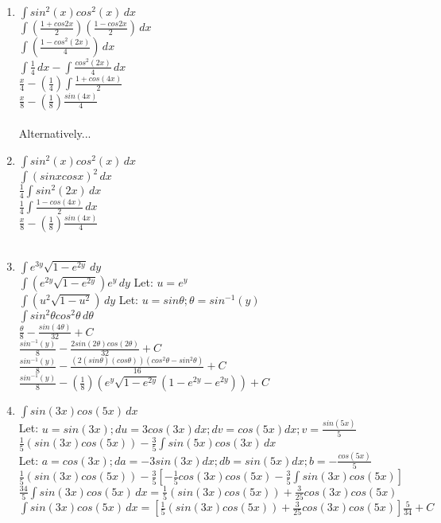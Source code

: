 \documentclass{article}
\begin{document}
\begin{enumerate}
\begin{enumerate}
        \item $\int sin^2(x)cos^2(x) \,dx$\\
        $\int {(\frac{1+cos2x}{2})(\frac{1-cos2x}{2})} \,dx$\\
        $\int {(\frac{1-cos^2(2x)}{4})} \,dx$\\
        $\int {\frac{1}{4}} \,dx - \int {\frac{cos^2(2x)}{4}} \,dx $\\
        $\frac{x}{4} - (\frac{1}{4})\int {\frac{1+cos(4x)}{2}}$\\
        $\frac{x}{8} - (\frac{1}{8})\frac{sin(4x)}{4}$\\\\
        Alternatively...\\
        \item $\int sin^2(x)cos^2(x) \,dx$\\
        $\int {(sinxcosx)^2} \,dx$\\
        $\frac{1}{4}\int {sin^2(2x)} \,dx$\\
        $\frac{1}{4}\int \frac{1-cos(4x)}{2} \,dx$\\
        $\frac{x}{8} - (\frac{1}{8})\frac{sin(4x)}{4}$\\\\

        \item $\int e^{3y}\sqrt{1-e^{2y}} \,dy$\\
        $\int (e^{2y}\sqrt{1-e^{2y}})e^{y} \,dy$  Let: $u=e^{y}$\\
        $\int (u^2\sqrt{1-u^2}) \,dy$ Let: $u=sin{\theta}; \theta=sin^{-1}(y)$\\
        $\int {sin^2\theta}{cos^2\theta} \,d\theta$\\
        $\frac{\theta}{8} - \frac{sin(4\theta)}{32} + C$\\
        $\frac{sin^{-1}(y)}{8} - \frac{2sin(2\theta)cos(2\theta)}{32} + C$\\
        $\frac{sin^{-1}(y)}{8} - \frac{(2(sin\theta)(cos\theta))(cos^2\theta-sin^2\theta)}{16} + C$\\
        $\frac{sin^{-1}(y)}{8} - (\frac{1}{8})(e^{y}\sqrt{1-e^{2y}}(1-e^{2y}-e^{2y})) + C$\\
        
        \item $\int {sin(3x)cos(5x)} \,dx$\\
        Let: $u=sin(3x);du=3cos(3x)dx;dv=cos(5x)dx;v=\frac{sin(5x)}{5}$\\
        $\frac{1}{5}(sin(3x)cos(5x)) - \frac{3}{5}\int {sin(5x)cos(3x)} \,dx$\\
        Let: $a=cos(3x);da=-3sin(3x)dx;db=sin(5x)dx;b=-\frac{cos(5x)}{5}$\\
        $\frac{1}{5}(sin(3x)cos(5x)) - \frac{3}{5} [-\frac{1}{5}cos(3x)cos(5x)- \frac{3}{5}\int {sin(3x)cos(5x)}]$\\
        $\frac{34}{5}\int {sin(3x)cos(5x)} \,dx = \frac{1}{5}(sin(3x)cos(5x)) + \frac{3}{25}cos(3x)cos(5x)$\\
        $\int {sin(3x)cos(5x)} \,dx = [\frac{1}{5}(sin(3x)cos(5x)) + \frac{3}{25}cos(3x)cos(5x)]\frac{5}{34} +C$\\


\end{enumerate}
\end{enumerate}
\end{document}
